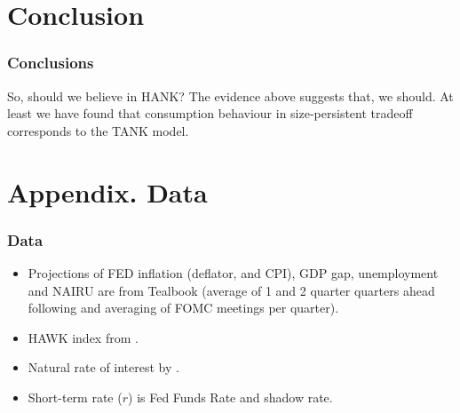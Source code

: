 \documentclass[10pt,aspectratio=169]{beamer}
\begin{document}
\section{Conclusion}
\begin{frame}\frametitle{Conclusions}
    \begin{block}{So, should we believe in HANK?}
        The evidence above suggests that, we should. 
        At least we have found that consumption behaviour in size-persistent tradeoff corresponds to the TANK model.
    \end{block}
\end{frame}





\lastslide





\appendix
\section{Appendix. Data}

\begin{frame}[label=backupSlide]\frametitle{Data}
    \begin{itemize}\setlength\itemsep{1em}
        \item Projections of FED inflation (deflator, and CPI), GDP gap, unemployment and NAIRU are from Tealbook {\color{gray}
        (average of 1 and 2 quarter quarters ahead following \cite{CoibionGorodnichenko2011} and averaging of FOMC meetings per quarter).}
        \item HAWK index from \cite{HIM2023}.
        \item Natural rate of interest by \cite{HLW2017,HLW2023}.
        \item Short-term rate ($r$) is Fed Funds Rate and \cite{WuXia2016} shadow rate.
        \end{itemize}
    \end{frame}
\end{document}
